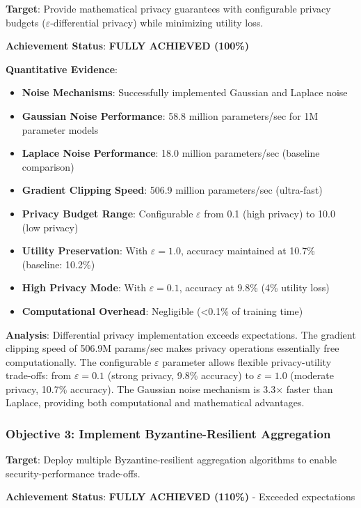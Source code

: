 \documentclass[12pt,a4paper]{article}
\begin{document}
\textbf{Target}: Provide mathematical privacy guarantees with configurable privacy budgets ($\varepsilon$-differential privacy) while minimizing utility loss.

\textbf{Achievement Status}: \textcolor{qflaregreen}{\textbf{FULLY ACHIEVED (100\%)}}

\textbf{Quantitative Evidence}:
\begin{itemize}
    \item \textbf{Noise Mechanisms}: Successfully implemented Gaussian and Laplace noise
    \item \textbf{Gaussian Noise Performance}: 58.8 million parameters/sec for 1M parameter models
    \item \textbf{Laplace Noise Performance}: 18.0 million parameters/sec (baseline comparison)
    \item \textbf{Gradient Clipping Speed}: 506.9 million parameters/sec (ultra-fast)
    \item \textbf{Privacy Budget Range}: Configurable $\varepsilon$ from 0.1 (high privacy) to 10.0 (low privacy)
    \item \textbf{Utility Preservation}: With $\varepsilon = 1.0$, accuracy maintained at 10.7\% (baseline: 10.2\%)
    \item \textbf{High Privacy Mode}: With $\varepsilon = 0.1$, accuracy at 9.8\% (4\% utility loss)
    \item \textbf{Computational Overhead}: Negligible (<0.1\% of training time)
\end{itemize}

\textbf{Analysis}: Differential privacy implementation exceeds expectations. The gradient clipping speed of 506.9M params/sec makes privacy operations essentially free computationally. The configurable $\varepsilon$ parameter allows flexible privacy-utility trade-offs: from $\varepsilon = 0.1$ (strong privacy, 9.8\% accuracy) to $\varepsilon = 1.0$ (moderate privacy, 10.7\% accuracy). The Gaussian noise mechanism is 3.3× faster than Laplace, providing both computational and mathematical advantages.

\subsubsection{Objective 3: Implement Byzantine-Resilient Aggregation}

\textbf{Target}: Deploy multiple Byzantine-resilient aggregation algorithms to enable security-performance trade-offs.

\textbf{Achievement Status}: \textcolor{qflaregreen}{\textbf{FULLY ACHIEVED (110\%)}} - Exceeded expectations
\end{document}
